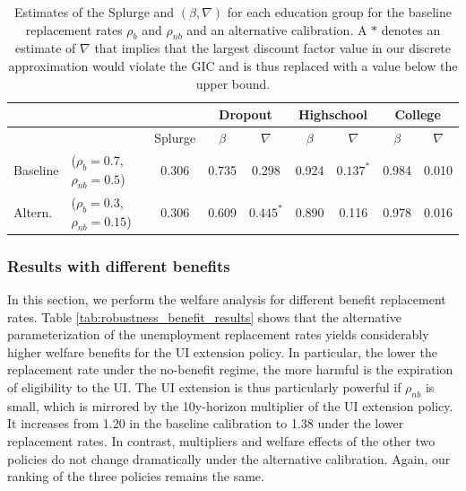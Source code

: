 \documentclass[\econtexRoot/HAFiscal]{subfiles}
\begin{document}
\begin{table}[t]
  \begin{center}
    \begin{tabular}{llc|cccccc} 
      \toprule
      & & & \multicolumn{2}{c}{Dropout} & \multicolumn{2}{c}{Highschool} & \multicolumn{2}{c}{College} \\ \midrule 
      & & Splurge & $\beta$ & $\nabla$ & $\beta$ & $\nabla$ & $\beta$ & $\nabla$ \\ \midrule 
      Baseline & ($\rho_{b}=0.7$, $\rho_{nb}=0.5$) & 0.306 & 0.735 & 0.298 & 0.924 & $0.137^{*}$ & 0.984 & 0.010 \\ 
      Altern. & ($\rho_{b}=0.3$,  $\rho_{nb}=0.15$) & 0.306 & 0.609 & $0.445^{*}$ & 0.890 & 0.116 & 0.978 & 0.016
      \\ \bottomrule 
    \end{tabular}
  \end{center}
  \caption{Estimates of the Splurge and $(\beta,\nabla)$ for each education group for the baseline replacement rates $\rho_{b}$ and $\rho_{nb}$ and an alternative calibration.
A $*$ denotes an estimate of $\nabla$ that implies that the largest discount factor value in our discrete approximation would violate the GIC and is thus replaced with a value below the upper bound.}
  \notinsubfile{\label{tab:robustness_benefits}}
\end{table}


\FloatBarrier
\subsubsection{Results with different benefits}
\notinsubfile{\label{sec:robust_benefits_results}}

In this section, we perform the welfare analysis for different benefit replacement rates.
Table \ref{tab:robustness_benefit_results} shows that the alternative parameterization of the unemployment replacement rates yields considerably higher welfare benefits for the UI extension policy.
In particular, the lower the replacement rate under the no-benefit regime, the more harmful is the expiration of eligibility to the UI.
The UI extension is thus particularly powerful if $\rho_{nb}$ is small, which is mirrored by the 10y-horizon multiplier of the UI extension policy.
It increases from 1.20 in the baseline calibration to 1.38 under the lower replacement rates.
In contrast, multipliers and welfare effects of the other two policies do not change dramatically under the alternative calibration.
Again, our ranking of the three policies remains the same.
\end{document}

